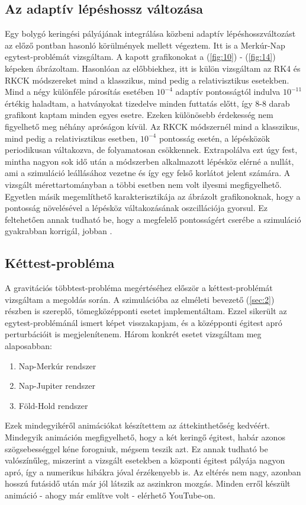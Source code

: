 \begin{multicols}{2}
\subsection{Az adaptív lépéshossz változása} \label{sub:4.2}
Egy bolygó keringési pályájának integrálása közbeni adaptív lépéshosszváltozást az előző pontban hasonló körülmények mellett végeztem. Itt is a Merkúr-Nap egytest-problémát vizsgáltam. A kapott grafikonokat a (\ref{fig:10}) - (\ref{fig:14}) képeken ábrázoltam. Hasonlóan az előbbiekhez, itt is külön vizsgáltam az RK4 és RKCK módszereket mind a klasszikus, mind pedig a relativisztikus esetekben. Mind a négy különféle párosítás esetében $10^{-4}$ adaptív pontosságtól indulva $10^{-11}$ értékig haladtam, a hatványokat tizedelve minden futtatás előtt, így 8-8 darab grafikont kaptam minden egyes esetre. Ezeken különösebb érdekesség nem figyelhető meg néhány apróságon kívül. Az RKCK módszernél mind a klasszikus, mind pedig a relativisztikus esetben, $10^{-4}$ pontosság esetén, a lépésközök periodikusan váltakozva, de folyamatosan csökkennek. Extrapolálva ezt úgy fest, mintha nagyon sok idő után a módszerben alkalmazott lépésköz elérné a nullát, ami a szimuláció leállásához vezetne és így egy felső korlátot jelent számára. A vizsgált mérettartományban a többi esetben nem volt ilyesmi megfigyelhető. Egyetlen másik megemlíthető karakterisztikája az ábrázolt grafikonoknak, hogy a pontosság növelésével a lépésköz váltakozásának oszcillációja gyorsul. Ez feltehetően annak tudható be, hogy a megfelelő pontosságért cserébe a szimuláció gyakrabban korrigál, jobban .

\subsection{Kéttest-probléma} \label{sub:4.3}
A gravitációs többtest-probléma megértéséhez először a kéttest-problémát vizsgáltam a megoldás során. A szimulációba az elméleti bevezető (\ref{sec:2}) részben is szereplő, tömegközépponti esetet implementáltam. Ezzel sikerült az egytest-problémánál ismert képet visszakapjam, és a középponti égitest apró perturbációit is megjelenítenem. Három konkrét esetet vizsgáltam meg alaposabban:

\begin{enumerate}
    \item Nap-Merkúr rendszer
    \item Nap-Jupiter rendszer
    \item Föld-Hold rendszer
\end{enumerate}
Ezek mindegyikéről animációkat készítettem az áttekinthetőség kedvéért. Mindegyik animáción megfigyelhető, hogy a két keringő égitest, habár azonos szögsebességgel kéne forogniuk, mégsem teszik azt. Ez annak tudható be valószínűleg, miszerint a vizsgált esetekben a központi égitest pályája nagyon apró, így a numerikus hibákra jóval érzékenyebb is. Az eltérés nem nagy, azonban hosszú futásidő után már jól látszik az aszinkron mozgás. Minden erről készült animáció - ahogy már említve volt - elérhető YouTube-on\cite{yt}.


\end{multicols}
